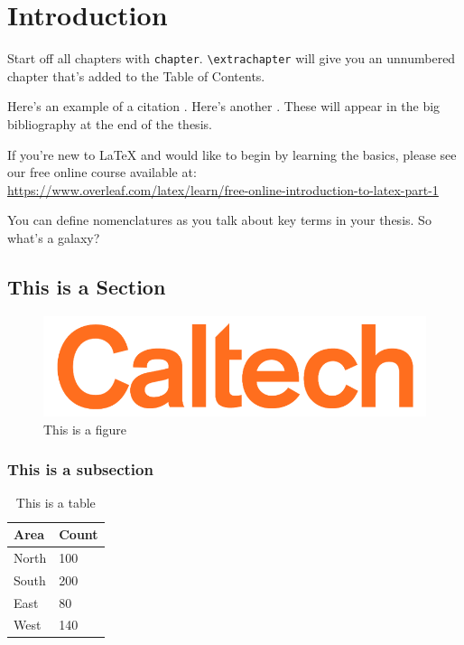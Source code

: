 \documentclass[12pt]{caltech_thesis}
\begin{document}
\tableofcontents
\listoffigures
\listoftables
\printnomenclature

\mainmatter

\chapter{Introduction}
Start off all chapters with \verb|chapter|.  \verb|\extrachapter| will give you an unnumbered chapter that's added to the Table of Contents. 

Here's an example of a citation \citep{GMP81}. Here's another \citep{PP98}. These will appear in the big bibliography at the end of the thesis.

If you're new to \LaTeX{} and would like to begin by learning the basics, please see our free online course available at:\\ \url{https://www.overleaf.com/latex/learn/free-online-introduction-to-latex-part-1} 

You can define nomenclatures  as you talk about
key terms in your thesis. So what's a galaxy? 

\section{This is a Section}
\lipsum[1-2]

\begin{figure}[hbt!]
\centering
\includegraphics[width=.3\textwidth]{caltech.png}
\caption{This is a figure}\label{fig:logo}
\end{figure}

\subsection{This is a subsection}

\begin{table}[hbt!]
\centering
\begin{tabular}{ll}
\hline
Area & Count\\
\hline
North & 100\\
South & 200\\
East & 80\\
West & 140\\
\hline
\end{tabular}
\caption{This is a table}\label{tab:sample}
\end{table}
\end{document}
